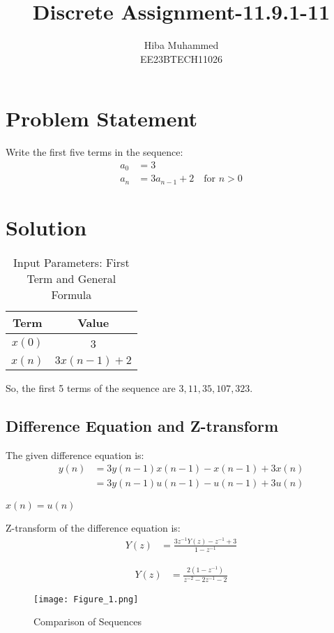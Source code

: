 \documentclass[12pt]{article}
\title{Discrete Assignment-11.9.1-11}
\author{Hiba Muhammed \\
        EE23BTECH11026}
\date{}
\begin{document}
\maketitle

\section*{Problem Statement}
Write the first five terms in the sequence:
\begin{align}
a_{0}  &= 3 \\
a_{n}  &= 3a_{n-1} + 2 \quad \text{for } n > 0
\end{align}

\section*{Solution}
\begin{table}[h]
  \centering
  \caption{Input Parameters: First Term and General Formula}
  \begin{tabular}{|c|c|}
    \hline
    \textbf{Term} & \textbf{Value} \\
    \hline
    \(x(0)\) & 3 \\
    \(x(n)\) & \(3x(n-1) + 2\) \\
    \hline
  \end{tabular}
\end{table}


So, the first 5 terms of the sequence are \(3, 11, 35, 107, 323\).

\subsection*{Difference Equation and Z-transform}

The given difference equation is:
\begin{align}
y(n) &= 3y(n-1)x(n-1) - x(n-1) + 3x(n) \\
     &= 3y(n-1)u(n-1) - u(n-1) + 3u(n)
\end{align}

\textbf{$x(n) = u(n)$}

Z-transform of the difference equation is:
\begin{align}
Y(z) &= \frac{3z^{-1}Y(z) - z^{-1} + 3}{1 - z^{-1}}
\end{align}

\begin{align}
Y(z) &= \frac{2(1 - z^{-1})}{z^{-2} - 2z^{-1} - 2}
\end{align}

\begin{figure}[h]
    \centering
    \texttt{[image: Figure\_1.png]}
    \caption{Comparison of Sequences}
    \label{fig:comparison}
\end{figure}
\end{document}
